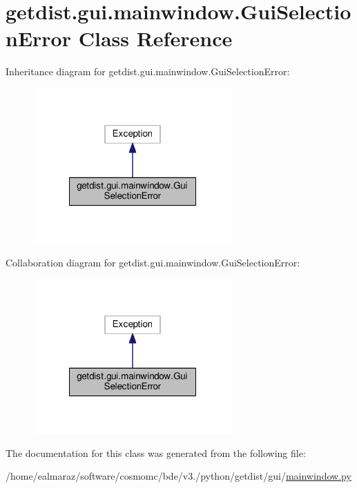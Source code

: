 \hypertarget{classgetdist_1_1gui_1_1mainwindow_1_1GuiSelectionError}{}\section{getdist.\+gui.\+mainwindow.\+Gui\+Selection\+Error Class Reference}
\label{classgetdist_1_1gui_1_1mainwindow_1_1GuiSelectionError}


Inheritance diagram for getdist.\+gui.\+mainwindow.\+Gui\+Selection\+Error\+:
\nopagebreak
\begin{figure}[H]
\begin{center}
\leavevmode
\includegraphics[width=216pt]{classgetdist_1_1gui_1_1mainwindow_1_1GuiSelectionError__inherit__graph}
\end{center}
\end{figure}


Collaboration diagram for getdist.\+gui.\+mainwindow.\+Gui\+Selection\+Error\+:
\nopagebreak
\begin{figure}[H]
\begin{center}
\leavevmode
\includegraphics[width=216pt]{classgetdist_1_1gui_1_1mainwindow_1_1GuiSelectionError__coll__graph}
\end{center}
\end{figure}


The documentation for this class was generated from the following file\+:\begin{DoxyCompactItemize}
\item 
/home/ealmaraz/software/cosmomc/bde/v3./python/getdist/gui/\mbox{\hyperlink{mainwindow_8py}{mainwindow.\+py}}\end{DoxyCompactItemize}
